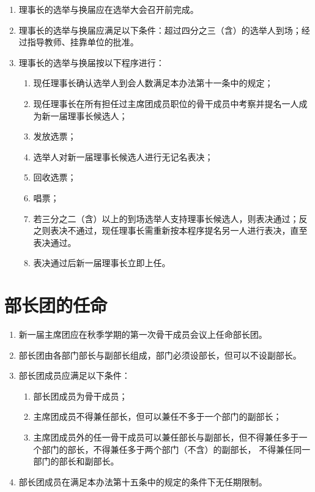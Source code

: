 \begin{enumerate}[resume]
    \item 理事长的选举与换届应在选举大会召开前完成。
    
    \item 理事长的选举与换届应满足以下条件：超过四分之三（含）的选举人到场；经过指导教师、挂靠单位的批准。
    
    \item 理事长的选举与换届按以下程序进行：
    
    \begin{enumerate}
        \item 现任理事长确认选举人到会人数满足本办法第十一条中的规定；
        \item 现任理事长在所有担任过主席团成员职位的骨干成员中考察并提名一人成为新一届理事长候选人；
        \item 发放选票；
        \item 选举人对新一届理事长候选人进行无记名表决；
        \item 回收选票；
        \item 唱票；
        \item 若三分之二（含）以上的到场选举人支持理事长候选人，则表决通过；反之则表决不通过，现任理事长需重新按本程序提名另一人进行表决，直至表决通过。
        \item 表决通过后新一届理事长立即上任。
    \end{enumerate}
    
\end{enumerate}

\section{部长团的任命}

\begin{enumerate}[resume]
    \item 新一届主席团应在秋季学期的第一次骨干成员会议上任命部长团。
    
    \item 部长团由各部门部长与副部长组成，部门必须设部长，但可以不设副部长。
    
    \item 部长团成员应满足以下条件：
    
    \begin{enumerate}
        \item 部长团成员为骨干成员；
        \item 主席团成员不得兼任部长，但可以兼任不多于一个部门的副部长；
        \item 主席团成员外的任一骨干成员可以兼任部长与副部长，但不得兼任多于一个部门的部长，不得兼任多于两个部门（不含）的副部长， 不得兼任同一部门的部长和副部长。
    \end{enumerate}
    
    \item 部长团成员在满足本办法第十五条中的规定的条件下无任期限制。
\end{enumerate}

